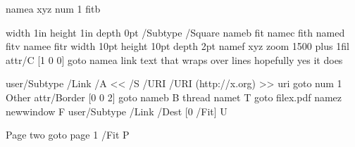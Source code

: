  
\pdfdest name{a} xyz \pdfdest num 1 fitb
\pdfannot width 1in height 1in depth 0pt {/Subtype /Square}\message{\the\pdflastannot}
\pdfdest name{b} fit \pdfdest name{c} fith \pdfdest name{d} fitv \pdfdest name{e} fitr width 10pt height 10pt depth 2pt \pdfdest name{f} xyz zoom 1500
\hsize=3in \parindent=0pt \rightskip=0pt plus 1fil
\noindent\pdfstartlink attr{/C [1 0 0]} goto name{a} link text that wraps over lines hopefully yes it does \pdfendlink\message{\the\pdflastlink}\par
\pdflinkmargin=2pt \noindent\pdfstartlink user{/Subtype /Link /A << /S /URI /URI (http://x.org) >>} uri \pdfendlink
\hfil\pdfstartlink goto num 1 Other \pdfendlink
\pdfstartlink attr{/Border [0 0 2]} goto name{b} B\pdfendlink
\pdfstartlink thread name{t} T\pdfendlink
\pdfstartlink goto file{x.pdf} name{z} newwindow F\pdfendlink
\pdfstartlink user{/Subtype /Link /Dest [0 /Fit]} U\pdfendlink
\par\vfill\eject Page two \pdfstartlink goto page 1 {/Fit} P\pdfendlink
\bye
